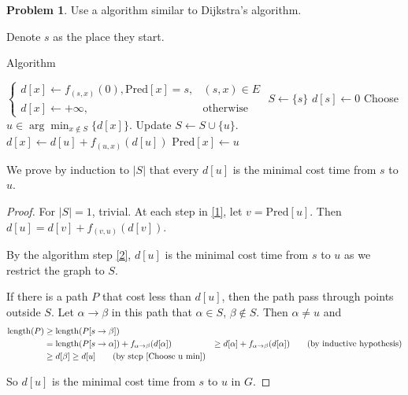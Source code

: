 \documentclass[a4paper]{article}
\theoremstyle{definition}
\newtheorem{problem}{Problem}
\theoremstyle{plain}
\newcommand{\dps}{\displaystyle}
\numberwithin{equation}{problem}
\begin{document}
\begin{problem}
  Use a algorithm similar to Dijkstra's algorithm.

  Denote  $ s $  as the place they start.
  \begin{algorithm}
    \caption{Algorithm}
    \label{alg:dijkstra}
    \begin{algorithmic}[1]
      \STATE   
      $ \begin{cases}
        d[x]\leftarrow f_{(s,x)}(0),\mathrm{Pred}[x]=s,&(s,x)\in E\\
        d[x]\leftarrow+\infty,&\text{otherwise}
      \end{cases}  $ 
      \STATE  $ S\leftarrow\{s\} $ 
      \STATE  $ d[s]\leftarrow 0 $ 
        \STATE Choose  $ u\in \dps\arg\min_{x\not\in S}\{d[x]\} $.\label{Choose u min}
        \STATE Update  $ S\leftarrow S\cup\{u\} $.\label{1}
        \label{2}
                \STATE  $ d[x]\leftarrow d[u]+f_{(u,x)}(d[u]) $  
                \STATE  $ \mathrm{Pred}[x]\leftarrow u $  
            \ENDIF
        \ENDFOR 
    \ENDWHILE
    \end{algorithmic}
\end{algorithm}
We prove by induction to  $ |S| $   that every  $ d[u] $ is the minimal cost time from  $ s $ to  $ u $.   
\begin{proof}
  For  $ |S|=1 $, trivial.
  At each step in \ref{1},  let  $ v=\mathrm{Pred}[u] $. Then  $ d[u]=d[v]+f_{(v,u)}(d[v]) $.

  By the algorithm step \ref{2},  $ d[u] $ is the minimal cost time from  $ s $ to  $ u $ as we restrict the graph to  $ S $.   
  
  If there is a path $ P $  that cost less than  $ d[u] $, then the path pass through points outside  $ S $. Let  $ \alpha\to \beta $ in this path that  $ \alpha\in S $,  $ \beta\not\in S $. Then  $ \alpha\neq u $ and  
  \begin{align*}
    \mathrm{length}(P)& \geq \mathrm{length}(P[s\rightarrow\beta])\\
    & =\mathrm{length}(P[s\rightarrow\alpha])+f_{\alpha\to \beta}(d[\alpha])\
    & \geq d[\alpha]+f_{\alpha\to \beta}(d[\alpha])\qquad(\text{by inductive hypothesis})\\
    & \geq d[\beta] \geq d[u]\qquad(\text{by step \ref{Choose u min}})
  \end{align*}

  So  $ d[u] $ is the minimal cost time from  $ s $ to  $ u $ in  $ G $.    
\end{proof}
\end{problem}
\end{document}

